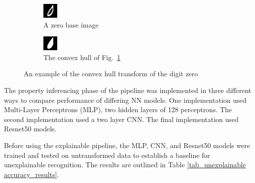 \documentclass[conference]{IEEEtran}
\begin{document}
\begin{figure}[h]
    \centering
    \begin{subfigure}{.5\columnwidth}
        \centering
        \includegraphics[width=.50\textwidth]{./images/raw_0-0-12.png}
        \caption{A zero base image}
        \label{fig:zero_raw}
    \end{subfigure}%
    \begin{subfigure}{.5\columnwidth}
        \centering
        \includegraphics[width=.50\textwidth]{./images/ch_0-0-12.png}
        \caption{The convex hull of Fig.~\ref{fig:zero_raw}}
        \label{fig:zero_ch}
    \end{subfigure}
    \caption{An example of the convex hull transform of the digit zero}
    \label{fig:chull_example}
\end{figure}

The property inferencing phase of the pipeline was implemented in three
different ways to compare performance of differing NN models.  One
implementation used Multi-Layer Perceptrons (MLP), two hidden layers of 128
perceptrons.  The second implementation used a two layer CNN.  The final
implementation used Resnet50 models.

Before using the explainable pipeline, the MLP, CNN, and Resnet50 models were
trained and tested on untransformed data to establish a baseline for
unexplainable recognition.  The results are outlined in Table
\ref{tab_unexplainable accuracy_results}.
\end{document}
